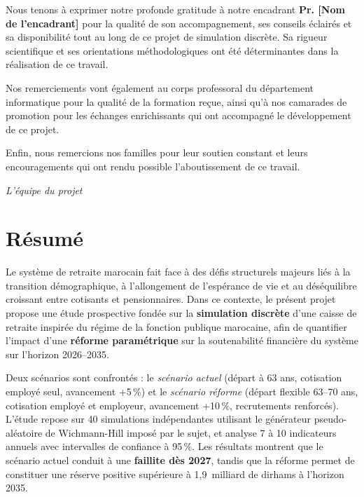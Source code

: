 \documentclass[12pt,a4paper,oneside]{report}
\begin{document}
Nous tenons à exprimer notre profonde gratitude à notre encadrant
\textbf{Pr. [Nom de l'encadrant]} pour la qualité de son accompagnement,
ses conseils éclairés et sa disponibilité tout au long de ce projet de
simulation discrète. Sa rigueur scientifique et ses orientations
méthodologiques ont été déterminantes dans la réalisation de ce travail.

Nos remerciements vont également au corps professoral du département
informatique pour la qualité de la formation reçue, ainsi qu'à nos camarades
de promotion pour les échanges enrichissants qui ont accompagné le
développement de ce projet.

Enfin, nous remercions nos familles pour leur soutien constant et leurs
encouragements qui ont rendu possible l'aboutissement de ce travail.

\begin{flushright}
\textit{L'équipe du projet}
\end{flushright}

\chapter*{Résumé}

Le système de retraite marocain fait face à des défis structurels majeurs
liés à la transition démographique, à l'allongement de l'espérance de vie
et au déséquilibre croissant entre cotisants et pensionnaires. Dans ce
contexte, le présent projet propose une étude prospective fondée sur la
\textbf{simulation discrète} d'une caisse de retraite inspirée du régime
de la fonction publique marocaine, afin de quantifier l'impact d'une
\textbf{réforme paramétrique} sur la soutenabilité financière du système
sur l'horizon 2026--2035.

Deux scénarios sont confrontés : le \emph{scénario actuel} (départ à 63 ans,
cotisation employé seul, avancement +5\,\%) et le \emph{scénario réforme}
(départ flexible 63--70 ans, cotisation employé et employeur, avancement
+10\,\%, recrutements renforcés). L'étude repose sur 40 simulations
indépendantes utilisant le générateur pseudo-aléatoire de Wichmann-Hill
imposé par le sujet, et analyse 7 à 10 indicateurs annuels avec intervalles
de confiance à 95\,\%. Les résultats montrent que le scénario actuel conduit
à une \textbf{faillite dès 2027}, tandis que la réforme permet de constituer
une réserve positive supérieure à 1,9~milliard de dirhams à l'horizon 2035.
\end{document}
